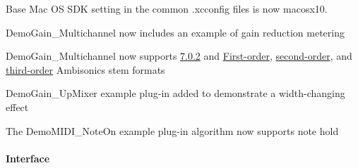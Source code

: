 \begin{DoxyItemize}
\item Base Mac OS S\+DK setting in the common .xcconfig files is now macosx10.  
\item Demo\+Gain\+\_\+\+Multichannel now includes an example of gain reduction metering  
\item Demo\+Gain\+\_\+\+Multichannel now supports \mbox{\hyperlink{a00491_ad8af5ef008b2bd478add9a0acb0a1d85ad4d60796473e660c7bc2804cdc93c587}{7.0.2}} and \mbox{\hyperlink{a00491_ad8af5ef008b2bd478add9a0acb0a1d85a398f50508a237917d9c81be645ca4b90}{First-\/order}}, \mbox{\hyperlink{a00491_ad8af5ef008b2bd478add9a0acb0a1d85af6461ee858e0f121f7a070142f047dbb}{second-\/order}}, and \mbox{\hyperlink{a00491_ad8af5ef008b2bd478add9a0acb0a1d85a111ef1882171d9eea1b1b436e037fb47}{third-\/order}} Ambisonics stem formats  
\item Demo\+Gain\+\_\+\+Up\+Mixer example plug-\/in added to demonstrate a width-\/changing effect  
\item The Demo\+M\+I\+D\+I\+\_\+\+Note\+On example plug-\/in algorithm now supports note hold  
\end{DoxyItemize}\hypertarget{a00847_aax_sdk_2p3p0_Interface}{}\paragraph{Interface}\label{a00847_aax_sdk_2p3p0_Interface}

